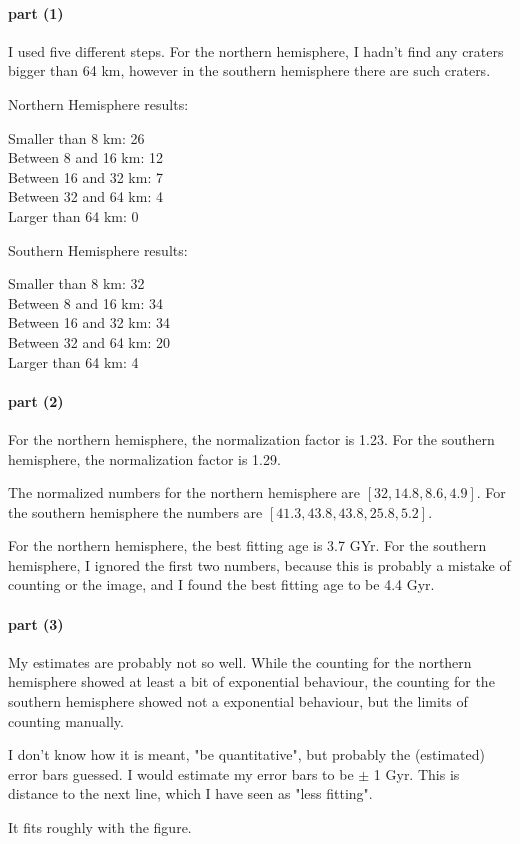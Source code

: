 \documentclass[12pt,a4paper]{article}
\begin{document}
\paragraph{part (1)}

I used five different steps. For the northern hemisphere, I hadn't find any craters bigger than 64 km, however in the southern hemisphere there are such craters.

Northern Hemisphere results:

Smaller than 8 km: 26 \\
Between 8 and 16 km: 12 \\
Between 16 and 32 km: 7 \\
Between 32 and 64 km: 4 \\
Larger than 64 km: 0

Southern Hemisphere results:

Smaller than 8 km: 32 \\
Between 8 and 16 km: 34 \\
Between 16 and 32 km: 34 \\
Between 32 and 64 km: 20 \\
Larger than 64 km: 4

\paragraph{part (2)}

For the northern hemisphere, the normalization factor is 1.23. For the southern hemisphere, the normalization factor is 1.29.

The normalized numbers for the northern hemisphere are $[32, 14.8, 8.6, 4.9]$. For the southern hemisphere the numbers are $[41.3, 43.8, 43.8, 25.8, 5.2]$.

For the northern hemisphere, the best fitting age is 3.7 GYr. For the southern hemisphere, I ignored the first two numbers, because this is probably a mistake of counting or the image, and I found the best fitting age to be 4.4 Gyr.

\paragraph{part (3)}

My estimates are probably not so well. While the counting for the northern hemisphere showed at least a bit of exponential behaviour, the counting for the southern hemisphere showed not a exponential behaviour, but the limits of counting manually. 

I don't know how it is meant, "be quantitative", but probably the (estimated) error bars guessed. I would estimate my error bars to be $\pm$ 1 Gyr. This is distance to the next line, which I have seen as "less fitting".

It fits roughly with the figure.
\end{document}
